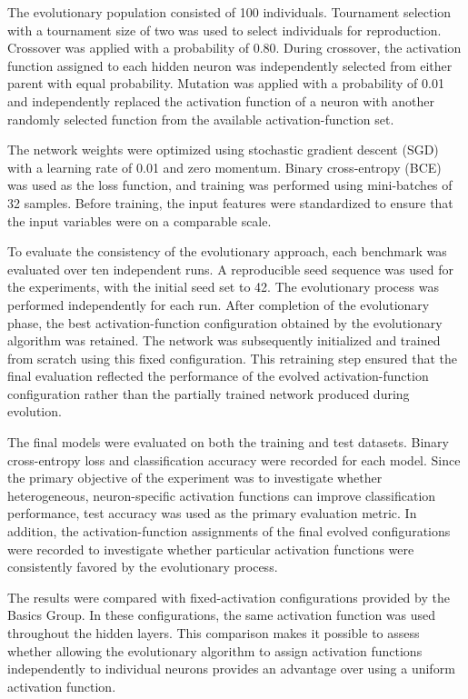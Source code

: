 \documentclass[12pt,fleqn,a4paper]{article}
\begin{document}
The evolutionary population consisted of 100 individuals. Tournament selection with a tournament size of two was used to select individuals for reproduction. Crossover was applied with a probability of 0.80. During crossover, the activation function assigned to each hidden neuron was independently selected from either parent with equal probability. Mutation was applied with a probability of 0.01 and independently replaced the activation function of a neuron with another randomly selected function from the available activation-function set.

The network weights were optimized using stochastic gradient descent (SGD) with a learning rate of 0.01 and zero momentum. Binary cross-entropy (BCE) was used as the loss function, and training was performed using mini-batches of 32 samples. Before training, the input features were standardized to ensure that the input variables were on a comparable scale.

To evaluate the consistency of the evolutionary approach, each benchmark was evaluated over ten independent runs. A reproducible seed sequence was used for the experiments, with the initial seed set to 42. The evolutionary process was performed independently for each run. After completion of the evolutionary phase, the best activation-function configuration obtained by the evolutionary algorithm was retained. The network was subsequently initialized and trained from scratch using this fixed configuration. This retraining step ensured that the final evaluation reflected the performance of the evolved activation-function configuration rather than the partially trained network produced during evolution.

The final models were evaluated on both the training and test datasets. Binary cross-entropy loss and classification accuracy were recorded for each model. Since the primary objective of the experiment was to investigate whether heterogeneous, neuron-specific activation functions can improve classification performance, test accuracy was used as the primary evaluation metric. In addition, the activation-function assignments of the final evolved configurations were recorded to investigate whether particular activation functions were consistently favored by the evolutionary process.

The results were compared with fixed-activation configurations provided by the Basics Group. In these configurations, the same activation function was used throughout the hidden layers. This comparison makes it possible to assess whether allowing the evolutionary algorithm to assign activation functions independently to individual neurons provides an advantage over using a uniform activation function.
\newpage
\end{document}

